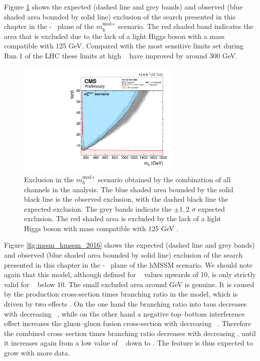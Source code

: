 Figure \ref{fig:mssm_mhmodp_2016} shows the expected (dashed line and grey bands) and
observed (blue shaded area bounded by solid line) exclusion of the search presented in this chapter
in the \mA-\tanb~ plane of the $m_{\text{h}}^{\text{mod+}}$ scenario. The red shaded band
indicates the area that is excluded due to the lack of a light Higgs boson with a mass compatible
with 125 GeV. Compared with the most sensitive limits set during Run 1 of the \ac{LHC} these
limits at high \tanb~ have improved by around 300 GeV.

\begin{figure}[h!]
\begin{center}
\includegraphics[width=0.7\textwidth]{./MSSM/Figures/CMS-PAS-HIG-16-037_Figure_012-a.pdf}
\end{center}
\caption{Exclusion in the $m_{h}^{\text{mod}+}$ scenario obtained by the combination
of all channels in the \AHtotautau analysis. The blue shaded area bounded by the 
solid black line is the observed exclusion, with the dashed black line the
expected exclusion. The grey bands indicate the $\pm 1,2$ $\sigma$ 
expected exclusion. The red shaded area
is excluded by the lack of a light Higgs boson with mass compatible with 125 GeV \cite{CMS-PAS-HIG-16-037}.}
\label{fig:mssm_mhmodp_2016}
\end{figure}

Figure \ref{fig:mssm_hmssm_2016} shows the expected (dashed line and grey bands)
and observed (blue shaded area bounded by solid line) exclusion of the search
presented in this chapter in the \mA-\tanb~ plane of the hMSSM scenario. 
We should note again that this model, although defined for \tanb~ values
upwards of 10, is only strictly valid for \tanb~ below 10.
The small excluded area around  GeV is genuine. It is caused by the 
production cross-section times branching ratio in the model, which is driven by
two effects \cite{CMS-PAS-HIG-16-007}. On the one hand the branching ratio into taus decreases with decreasing
\tanb~, while on the other hand a negative top--bottom interference effect increases the
gluon--gluon fusion cross-section with decreasing \tanb~. Therefore the
combined cross--section times branching ratio decreases with decreasing \tanb, until it
increases again from a low value of \tanb~ down to . The feature is 
thus expected to grow with more data.


